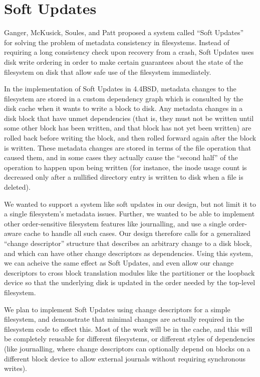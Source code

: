 \section{Soft Updates}
\label{sec:softupdates}

Ganger, McKusick, Soules, and Patt proposed a system called ``Soft
Updates''~\cite{ganger00soft} for solving the problem of metadata
consistency in filesystems. Instead of requiring a long consistency
check upon recovery from a crash, Soft Updates uses disk write
ordering in order to make certain guarantees about the state of the
filesystem on disk that allow safe use of the filesystem immediately.

In the implementation of Soft Updates in 4.4BSD, metadata changes to
the filesystem are stored in a custom dependency graph which is
consulted by the disk cache when it wants to write a block to disk.
Any metadata changes in a disk block that have unmet dependencies
(that is, they must not be written until some other block has been
written, and that block has not yet been written) are rolled back
before writing the block, and then rolled forward again after the
block is written. These metadata changes are stored in terms of the
file operation that caused them, and in some cases they actually cause
the ``second half'' of the operation to happen upon being written (for
instance, the inode usage count is decreased only after a nullified
directory entry is written to disk when a file is deleted).

We wanted to support a system like soft updates in our design, but not
limit it to a single filesystem's metadata issues. Further, we wanted
to be able to implement other order-sensitive filesystem features like
journalling, and use a single order-aware cache to handle all such
cases. Our design therefore calls for a generalized ``change
descriptor'' structure that describes an arbitrary change to a disk
block, and which can have other change descriptors as dependencies.
Using this system, we can acheive the same effect as Soft Updates, and
even allow our change descriptors to cross block translation modules
like the partitioner or the loopback device so that the underlying
disk is updated in the order needed by the top-level filesystem.

We plan to implement Soft Updates using change descriptors for a
simple filesystem, and demonstrate that minimal changes are actually
required in the filesystem code to effect this. Most of the work will
be in the cache, and this will be completely reusable for different
filesystems, or different styles of dependencies (like journalling,
where change descriptors can optionally depend on blocks on a
different block device to allow external journals without requiring
synchronous writes).
